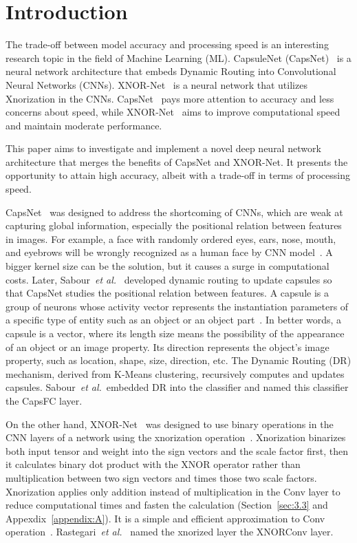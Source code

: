 \documentclass[sn-mathphys,iicol,Numbered]{sn-jnl}
\newcommand{\etal}{\textit{et al.}}
\begin{document}
\maketitle

\section{Introduction} \label{sec:1}

The trade-off between model accuracy and processing speed is an interesting research topic in the field of Machine Learning (ML). CapsuleNet (CapsNet)~\cite{A1_caps} is a neural network architecture that embeds Dynamic Routing into Convolutional Neural Networks (CNNs). XNOR-Net~\cite{A2_xnor} is a neural network that utilizes Xnorization in the CNNs. CapsNet~\citep{A1_caps} pays more attention to accuracy and less concerns about speed, while XNOR-Net~\citep{A2_xnor} aims to improve computational speed and maintain moderate performance. 

This paper aims to investigate and implement a novel deep neural network architecture that merges the benefits of CapsNet and XNOR-Net. It presents the opportunity to attain high accuracy, albeit with a trade-off in terms of processing speed.

CapsNet~\citep{A1_caps} was designed to address the shortcoming of CNNs, which are weak at capturing global information, especially the positional relation between features in images. For example, a face with randomly ordered eyes, ears, nose, mouth, and eyebrows will be wrongly recognized as a human face by CNN model~\cite{A62_face_align}. A bigger kernel size can be the solution, but it causes a surge in computational costs. Later, Sabour~\etal~\cite{A1_caps} developed dynamic routing to update capsules so that CapsNet studies the positional relation between features. A capsule is a group of neurons whose activity vector represents the instantiation parameters of a specific type of entity such as an object or an object part~\cite{A1_caps}. In better words, a capsule is a vector, where its length size means the possibility of the appearance of an object or an image property. Its direction represents the object's image property, such as location, shape, size, direction, etc. The Dynamic Routing (DR) mechanism, derived from K-Means clustering, recursively computes and updates capsules. Sabour~\etal~embedded DR into the classifier and named this classifier the CapsFC layer.

On the other hand, XNOR-Net~\cite{A2_xnor} was designed to use binary operations in the CNN layers of a network using the xnorization operation~\cite{A2_xnor}. Xnorization binarizes both input tensor and weight into the sign vectors and the scale factor first, then it calculates binary dot product with the XNOR operator rather than multiplication between two sign vectors and times those two scale factors. Xnorization applies only addition instead of multiplication in the Conv layer to reduce computational times and fasten the calculation (Section~\ref{sec:3.3} and Appexdix~\ref{appendix:A}). It is a simple and efficient approximation to Conv operation~\citep{A2_xnor}. Rastegari~\etal~\citep{A2_xnor} named the xnorized layer the XNORConv layer.
\end{document}
